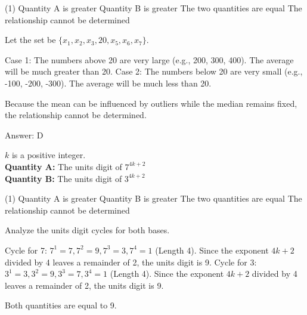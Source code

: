 \documentclass[11pt,paper=a4,answers]{exam}
\begin{document}
\begin{questions}
\begin{tasks}(1)
\task[A)] Quantity A is greater
\task[B)] Quantity B is greater
\task[C)] The two quantities are equal
\task[D)] The relationship cannot be determined
\end{tasks}

\begin{solution}
Let the set be $\{x_1, x_2, x_3, 20, x_5, x_6, x_7\}$.
\vspace{5pt}
\begin{center}
Case 1: The numbers above 20 are very large (e.g., 200, 300, 400). The average will be much greater than 20.
\vspace{5pt}
Case 2: The numbers below 20 are very small (e.g., -100, -200, -300). The average will be much less than 20.
\end{center}
\vspace{5pt}
Because the mean can be influenced by outliers while the median remains fixed, the relationship cannot be determined.

Answer: \colorbox{yellow!100}{D}
\end{solution}

\vspace{1cm}

\question
$k$ is a positive integer.
\vspace{5pt}\\
\textbf{Quantity A: } The units digit of $7^{4k+2}$ \\
\vspace{5pt}
\textbf{Quantity B: } The units digit of $3^{4k+2}$

\begin{tasks}(1)
\task[A)] Quantity A is greater
\task[B)] Quantity B is greater
\task[C)] The two quantities are equal
\task[D)] The relationship cannot be determined
\end{tasks}

\begin{solution}
Analyze the units digit cycles for both bases.
\vspace{5pt}
\begin{center}
Cycle for 7: $7^1=7, 7^2=9, 7^3=3, 7^4=1$ (Length 4).
\vspace{5pt}
Since the exponent $4k+2$ divided by 4 leaves a remainder of 2, the units digit is 9.
\vspace{10pt}
Cycle for 3: $3^1=3, 3^2=9, 3^3=7, 3^4=1$ (Length 4).
\vspace{5pt}
Since the exponent $4k+2$ divided by 4 leaves a remainder of 2, the units digit is 9.
\end{center}
\vspace{5pt}
Both quantities are equal to 9.


\end{solution}
\end{questions}
\end{document}
